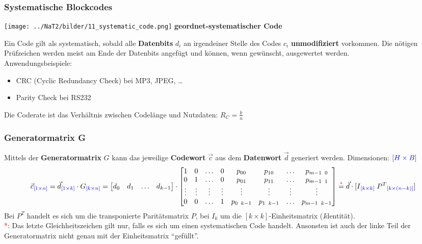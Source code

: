 \subsubsection{Systematische Blockcodes }
\begin{minipage}{5.5cm}
	\texttt{[image: ../NaT2/bilder/11\_systematic\_code.png]}
	\centering \textbf{geordnet-systematischer Code}
\end{minipage}
\begin{minipage}{12.8cm}
	Ein Code gilt als systematisch, sobald alle \textbf{Datenbits} $d_i$ an irgendeiner Stelle des Codes $c_i$
	\textbf{unmodifiziert} vorkommen. Die nötigen Prüfzeichen werden meist am Ende
	der Datenbits angefügt und können, wenn gewünscht, ausgewertet werden.\\ Anwendungsbeispiele:
	\begin{itemize}
    	\item CRC (Cyclic Redundancy Check) bei MP3, JPEG, \ldots
    	\item Parity Check bei RS232
  	\end{itemize}	
	Die Coderate ist das Verhältnis zwischen Codelänge und Nutzdaten: $R_C = \frac{k}{n}$
\end{minipage} 

\subsubsection{Generatormatrix G}
Mittels der \textbf{Generatormatrix} $G$ kann das jeweilige \textbf{Codewort} $\vec{c}$ aus dem \textbf{Datenwort} $\vec{d}$
generiert werden. Dimensionen: $\textcolor{blue}{[H\times B]}$
$$ \vec{c}\textcolor{blue}{_{[1 \times n]}} =
\vec{d}\textcolor{blue}{_{[1 \times k]}} \cdot G\textcolor{blue}{_{[k \times n]}} =
                \begin{bmatrix} d_0 & d_1 & \ldots & d_{k-1} \end{bmatrix} 
				\cdot \begin{bmatrix} 
					1 & 0 & \ldots & 0 & p_{00} & p_{10} & \ldots & p_{m-1 \;\; 0} \\              
					0 & 1 & \ldots & 0 & p_{01} & p_{11} & \ldots & p_{m-1 \;\; 1} \\
					\vdots & \vdots & \vdots & \vdots & \vdots & \vdots & \vdots & \vdots \\
					0 & 0 & \ldots & 1 & p_{0 \;\; k-1} & p_{1 \;\; k-1} & \ldots & p_{m-1 \;\; k-1} \\
				\end{bmatrix} \overset{\textcolor{red}{*}}{=} \vec{d} \cdot [I\textcolor{blue}{_{[k \times k]}} \;
				P^T\textcolor{blue}{_{[k \times (n-k)]}}] $$ Bei $P^T$ handelt es sich um die transponierte
				Paritätsmatrix $P$, bei $I_k$ um die $[k \times k]$-Einheitsmatrix (\emph{I}dentität). \\
\textcolor{red}{*}: Das letzte Gleichheitszeichen gilt nur, falls
es sich um einen systematischen Code handelt. Ansonsten ist auch der linke Teil der Generatormatrix
nicht genau mit der Einheitsmatrix ``gefüllt''.

